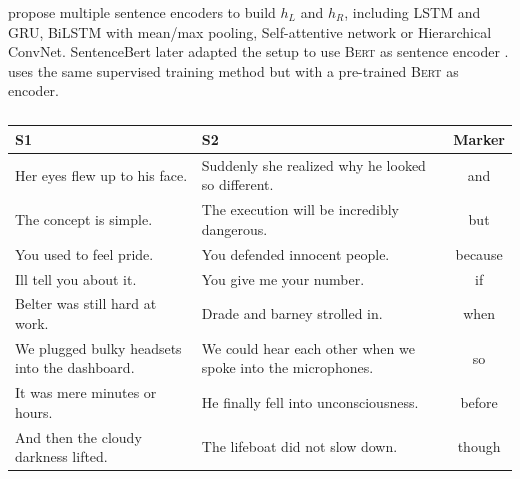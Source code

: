 \textcite{conneau_17} propose multiple sentence encoders to build $h_{L} $ and $h_{R}$, including LSTM and GRU, BiLSTM with mean/max pooling, Self-attentive network or Hierarchical ConvNet. SentenceBert later adapted the setup to use \textsc{Bert} as sentence encoder \parencite{reimers_19}. \textcite{reimers_19} uses the same supervised training method but with a pre-trained \textsc{Bert} as encoder.







\begin{table}[!htb]
\centering
\footnotesize
\begin{tabularx}{16cm}{@{}X X c@{}}
\toprule
\textbf{S1} & \textbf{S2} & \textbf{Marker}\\
\midrule
\midrule 
Her eyes flew up to his face.
&Suddenly she realized why he looked so different.&
and\\
The concept is simple.
&The execution will be incredibly dangerous.&
but \\
You used to feel pride.
&You defended innocent people.&
because \\
Ill tell you about it.
&You give me your number.&
if \\
Belter was still hard at work.
&Drade and barney strolled in.&
when \\
We plugged bulky headsets into the dashboard.
&We could hear each other when we spoke into the microphones.&
so \\
It was mere minutes or hours.
&He finally fell into unconsciousness.&
before \\
And then the cloudy darkness lifted.
&The lifeboat did not slow down.&
though \\
\bottomrule
\end{tabularx}
\caption{}
\end{table}

